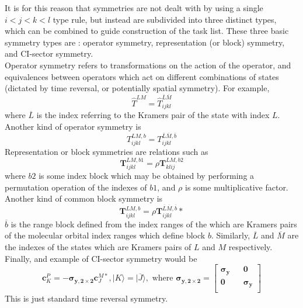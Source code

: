 \documentclass[12pt]{article}
\begin{document}
\noindent It is for this reason that symmetries are not dealt with by using a single $i<j<k<l$ type rule, but instead are
subdivided into three distinct types, which can be combined to guide construction of the task list. These
three basic symmetry types are : operator symmetry, representation (or block) symmetry, and CI-sector symmetry.\\ 

\noindent Operator symmetry refers to transformations on the action of the operator, and equivalences between operators
which act on different combinations of states (dictated by time reversal, or potentially spatial symmetry). For example,
\begin{equation}
\hat{T}^{LM} = \hat{T}^{\overline{L}\overline{M}}_{ijkl} 
\end{equation}
\noindent where $\overline{L}$ is the index referring to the Kramers pair of the state with index $L$.
Another kind of operator symmetry is
\begin{equation}
T^{LM, b}_{ijkl} = T^{\overline{L}\overline{M}, \overline{b}}_{ijkl} 
\end{equation}
Representation or block symmetries are relations such as 
\begin{equation}
\mathbf{T}^{LM, b1}_{ijkl} = \rho \mathbf{T}^{LM, b2}_{klij} 
\end{equation}
where $b2$ is some index block which may be obtained by performing a
permutation operation of the indexes of $b1$, and $\rho$ is some multiplicative factor.
Another kind of common block symmetry is
\begin{equation}
\mathbf{T}^{LM, b}_{ijkl} = \rho \mathbf{T}^{\overline{L}\overline{M}, \overline{b}}_{ijkl}* 
\end{equation}
$\overline{b}$ is the range
block defined from the index ranges of the which are Kramers pairs of the
molecular orbital index ranges which define block $b$. Similarly, $\overline{L}$
and  $\overline{M}$ are the indexes of the states which are Kramers pairs of
$L$ and $M$ respectively.\\

\noindent Finally, and example of CI-sector symmetry would be
\begin{equation*} 
\mathbf{c}_{K}^{P} =  -\boldsymbol{\sigma_{y,2\times 2}}\mathbf{c}_{J}^{M*}, 
|K\rangle =  |\overline{J}\rangle, 
\text{ \ \ \ where  \ \ \ } 
\boldsymbol{\sigma_{y,2\times 2}} = 
\begin{bmatrix}
\boldsymbol{\sigma_{y}} && \mathbf{0} \\ 
\mathbf{0} && \boldsymbol{\sigma_{y}} \\
\end{bmatrix}
\end{equation*}
\noindent This is just standard time reversal symmetry.
\end{document}

